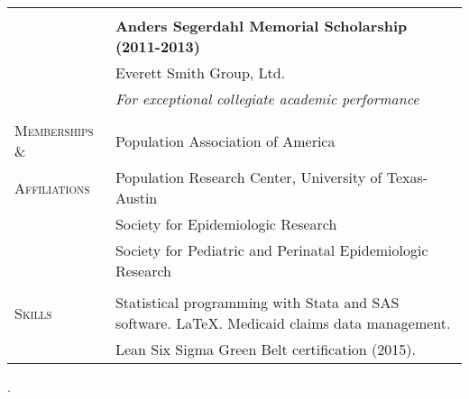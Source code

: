 \documentclass[letterpaper,10pt,oneside]{article}
\begin{document}
\begin{longtable}{@{} p{} p{}}
     & \\
     &\textbf{Anders Segerdahl Memorial Scholarship (2011-2013)} \\
     & Everett Smith Group, Ltd. \\
     & \textit{For exceptional collegiate academic performance} \\
     & \\
\textsc{Memberships \&} & Population Association of America \\
\textsc{Affiliations} & Population Research Center, University of Texas-Austin \\
     & Society for Epidemiologic Research \\
     & Society for Pediatric and Perinatal Epidemiologic Research \\
     & \\
\textsc{Skills} & Statistical programming with Stata and SAS software. \LaTeX. Medicaid claims data management. \\
     & Lean Six Sigma Green Belt certification (2015).\\
\end{longtable}. 
\end{document}
